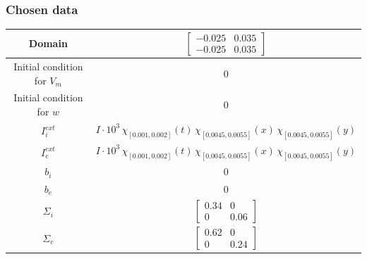 \documentclass[8pt]{beamer}
\begin{document}
\begin{frame}
\frametitle{Chosen data}
\begin{center}
	\begin{tabular}{|c|c|} 
		\hline 
		Domain & $\begin{bmatrix} -0.025 & 0.035 \\ -0.025 & 0.035\end{bmatrix}$ \\
		\hline
		Initial condition for $V_m$ & 0 \\
		\hline
		Initial condition for $w$ & 0 \\
		\hline
		$I_i^{ext}$ & $I \cdot 10^3 \, \chi_{[0.001,0.002]}(t) \, \chi_{[0.0045,0.0055]}(x) \, \chi_{[0.0045,0.0055]}(y)$ \\
		\hline
		$I_e^{ext}$ & $I \cdot 10^3 \, \chi_{[0.001,0.002]}(t) \, \chi_{[0.0045,0.0055]}(x) \, \chi_{[0.0045,0.0055]}(y)$ \\
		\hline
		$b_i$ & 0 \\
		\hline
		$b_e$ & 0 \\
		\hline
		$\Sigma_i$ & $\begin{bmatrix} 0.34 & 0 \\ 0 & 0.06\end{bmatrix}$ \\
		\hline
		$\Sigma_e$ & $\begin{bmatrix} 0.62 & 0 \\ 0 & 0.24 \end{bmatrix}$ \\
		\hline 
	\end{tabular}
\end{center}
\end{frame}
\end{document}
